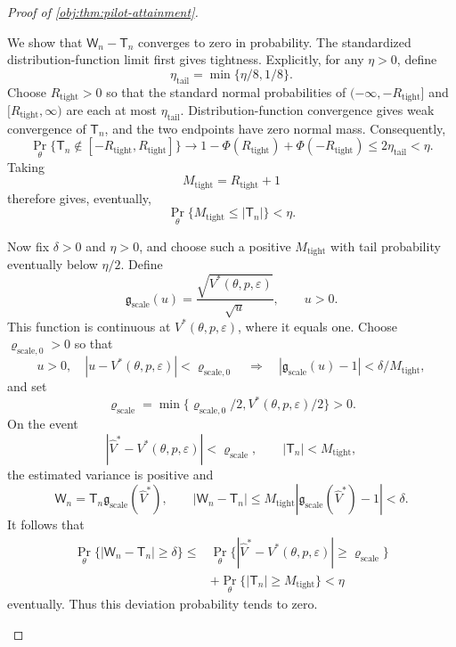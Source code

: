\documentclass[11pt]{article}
\begin{document}
\begin{proof}[Proof of \cref{obj:thm:pilot-attainment}]
\begin{enumerate}
We show that \(\mathsf W_n-\mathsf T_n\) converges to zero in probability. The standardized distribution-function limit first gives tightness. Explicitly, for any \(\eta>0\), define
\[
\eta_{\mathrm{tail}}=\min\{\eta/8,1/8\}.
\]
Choose \(R_{\mathrm{tight}}>0\) so that the standard normal probabilities of
\((-\infty,-R_{\mathrm{tight}}]\) and
\([R_{\mathrm{tight}},\infty)\) are each at most
\(\eta_{\mathrm{tail}}\). Distribution-function convergence gives weak convergence of \(\mathsf T_n\), and the two endpoints have zero normal mass. Consequently,
\[
\Pr_\theta\{\mathsf T_n\notin[-R_{\mathrm{tight}},R_{\mathrm{tight}}]\}
\longrightarrow
1-\Phi(R_{\mathrm{tight}})+\Phi(-R_{\mathrm{tight}})
\le2\eta_{\mathrm{tail}}<\eta.
\]
Taking
\[
M_{\mathrm{tight}}=R_{\mathrm{tight}}+1
\]
therefore gives, eventually,
\[
\Pr_\theta\{M_{\mathrm{tight}}\le|\mathsf T_n|\}<\eta.
\]

Now fix \(\delta>0\) and \(\eta>0\), and choose such a positive
\(M_{\mathrm{tight}}\) with tail probability eventually below \(\eta/2\).
Define
\[
\mathfrak g_{\mathrm{scale}}(u)
=\frac{\sqrt{V^*(\theta,p,\varepsilon)}}{\sqrt u},
\qquad u>0.
\]
This function is continuous at \(V^*(\theta,p,\varepsilon)\), where it equals one. Choose \(\varrho_{\mathrm{scale},0}>0\) so that
\[
u>0,\quad |u-V^*(\theta,p,\varepsilon)|<\varrho_{\mathrm{scale},0}
\quad\Longrightarrow\quad
|\mathfrak g_{\mathrm{scale}}(u)-1|
<\delta/M_{\mathrm{tight}},
\]
and set
\[
\varrho_{\mathrm{scale}}
=
\min\{\varrho_{\mathrm{scale},0}/2,
V^*(\theta,p,\varepsilon)/2\}>0.
\]
On the event
\[
|\widehat V^*-V^*(\theta,p,\varepsilon)|
<\varrho_{\mathrm{scale}},
\qquad
|\mathsf T_n|<M_{\mathrm{tight}},
\]
the estimated variance is positive and
\[
\mathsf W_n
=\mathsf T_n\mathfrak g_{\mathrm{scale}}(\widehat V^*),
\qquad
|\mathsf W_n-\mathsf T_n|
\le M_{\mathrm{tight}}
|\mathfrak g_{\mathrm{scale}}(\widehat V^*)-1|
<\delta.
\]
It follows that
\[
\begin{aligned}
\Pr_\theta\{|\mathsf W_n-\mathsf T_n|\ge\delta\}
\le{}&
\Pr_\theta\{|\widehat V^*-V^*(\theta,p,\varepsilon)|
\ge\varrho_{\mathrm{scale}}\}\\
&+\Pr_\theta\{|\mathsf T_n|\ge M_{\mathrm{tight}}\}
<\eta
\end{aligned}
\]
eventually. Thus this deviation probability tends to zero.


\end{enumerate}
\end{proof}
\end{document}
